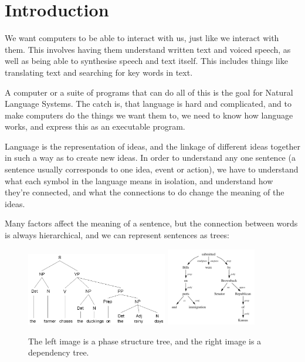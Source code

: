 
\section{Introduction}

We want computers to be able to interact with us, just like we interact with
them. This involves having them understand written text and voiced speech, as
well as being able to synthesise speech and text itself. This includes things
like translating text and searching for key words in text.

A computer or a suite of programs that can do all of this is the goal for
Natural Language Systems. The catch is, that language is hard and complicated,
and to make computers do the things we want them to, we need to know how
language works, and express this as an executable program.

Language is the representation of ideas, and the linkage of different ideas
together in such a way as to create new ideas. In order to understand any one
sentence (a sentence usually corresponds to one idea, event or action), we have
to understand what each symbol in the language means in isolation, and
understand how they're connected, and what the connections to do change the
meaning of the ideas.

Many factors affect the meaning of a sentence, but the connection between words
is always hierarchical, and we can represent sentences as trees:

\begin{figure}[ht]
  \centering
  \includegraphics[width=0.55\textwidth]{images/phase-structure-tree}
  \includegraphics[width=0.35\textwidth]{images/dependency-tree}
  \caption{The left image is a phase structure tree, and the right image is a
  dependency tree.}
  \label{fig:trees}
\end{figure}

